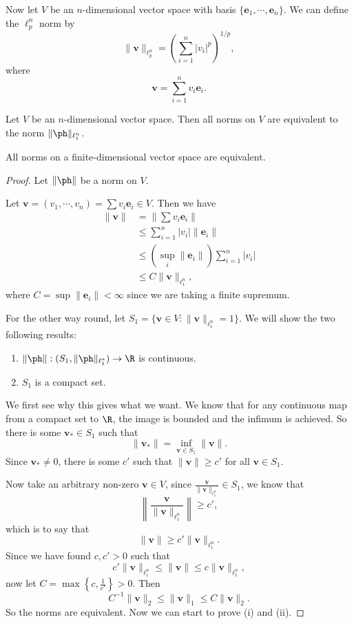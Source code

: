 \documentclass[a4paper]{article}
\begin{document}
Now let $V$ be an $n$-dimensional vector space with basis $\{\mathbf{e}_1, \cdots, \mathbf{e}_n\}$. We can define the $\ell_p^n$ norm by
\[
  \|\mathbf{v}\|_{\ell_p^n} = \left(\sum_{i = 1}^n |v_i|^p \right)^{1/p},
\]
where
\[
  \mathbf{v} = \sum_{i = 1}^n v_i \mathbf{e}_i.
\]
\begin{prop}
  Let $V$ be an $n$-dimensional vector space. Then all norms on $V$ are equivalent to the norm $\|\ph\|_{\ell_1^n}$.
\end{prop}

\begin{cor}
  All norms on a finite-dimensional vector space are equivalent.
\end{cor}

\begin{proof}
  Let $\|\ph \|$ be a norm on $V$.

  Let $\mathbf{v} = (v_1, \cdots, v_n) = \sum v_i \mathbf{e}_i \in V$. Then we have
  \begin{align*}
    \|\mathbf{v}\| &= \left\|\sum v_i \mathbf{e}_i\right\|\\
    &\leq \sum_{i = 1}^n |v_i|\|\mathbf{e}_i\|\\
    &\leq \left(\sup_i \|\mathbf{e}_i\|\right) \sum_{i = 1}^n |v_i|\\
    &\leq C\|\mathbf{v}\|_{\ell_1^n},
  \end{align*}
  where $C = \sup \|\mathbf{e}_i\| < \infty$ since we are taking a finite supremum.

  For the other way round, let $S_1 = \{\mathbf{v}\in V: \|\mathbf{v}\|_{\ell_1^n} = 1\}$. We will show the two following results:
  \begin{enumerate}
    \item $\|\ph \|: (S_1, \|\ph \|_{\ell_1^*}) \to \R$ is continuous.
    \item $S_1$ is a compact set.
  \end{enumerate}
  We first see why this gives what we want. We know that for any continuous map from a compact set to $\R$, the image is bounded and the infimum is achieved. So there is some $\mathbf{v}_* \in S_1$ such that
  \[
    \|\mathbf{v}_*\| = \inf_{\mathbf{v}\in S_1} \|\mathbf{v}\|.
  \]
  Since $\mathbf{v}_*\not= 0$, there is some $c'$ such that $\|\mathbf{v}\| \geq c'$ for all $\mathbf{v} \in S_1$.

  Now take an arbitrary non-zero $\mathbf{v} \in V$, since $\frac{\mathbf{v}}{\|\mathbf{v}\|_{\ell_1^n}} \in S_1$, we know that
  \[
    \left\|\frac{\mathbf{v}}{\|\mathbf{v}\|_{\ell_1^n}}\right\| \geq c',
  \]
  which is to say that
  \[
    \|\mathbf{v}\| \geq c' \|\mathbf{v}\|_{\ell_1^n}.
  \]
  Since we have found $c, c' > 0$ such that
  \[
    c' \|\mathbf{v}\|_{\ell_1^n} \leq \|\mathbf{v}\|\leq c \| \mathbf{v}\|_{\ell_1^n},
  \]
  now let $C = \max\left\{c, \frac{1}{c'}\right\} > 0$. Then
  \[
    C^{-1}\|\mathbf{v}\|_2 \leq \|\mathbf{v}\|_1 \leq C\|\mathbf{v}\|_2.
  \]
  So the norms are equivalent. Now we can start to prove (i) and (ii).


\end{proof}
\end{document}
